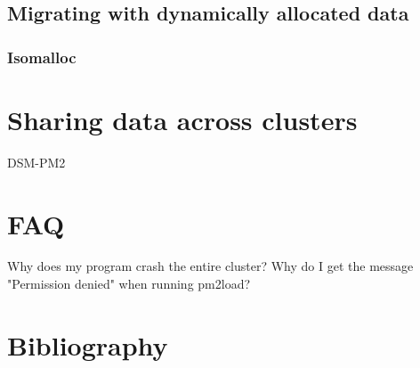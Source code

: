 \documentclass[a4paper,11pt]{article}
\begin{document}
\subsection{Migrating with dynamically allocated data}

\subsubsection{Isomalloc}


\section{Sharing data across clusters}
        DSM-PM2


\section{FAQ}
        Why does my program crash the entire cluster?
        Why do I get the message "Permission denied" when running pm2load?


\section{Bibliography}
                
\end{document}
